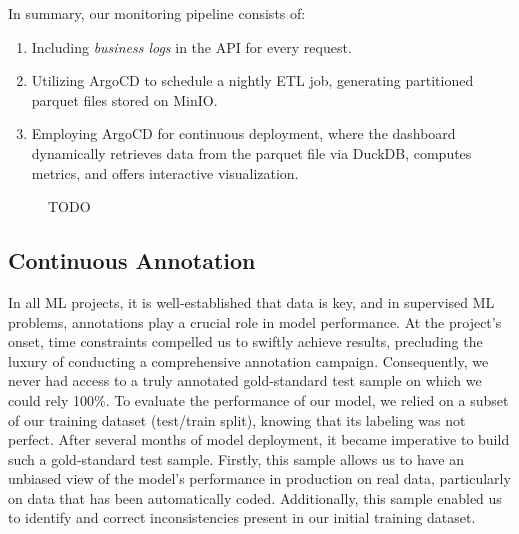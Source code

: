 In summary, our monitoring pipeline consists of:

\begin{enumerate}
    \item Including \textit{business logs} in the API for every request.
    \item Utilizing ArgoCD to schedule a nightly ETL job, generating partitioned parquet files stored on MinIO.
    \item Employing ArgoCD for continuous deployment, where the dashboard dynamically retrieves data from the parquet file via DuckDB, computes metrics, and offers interactive visualization.

\end{enumerate}

\begin{figure}[htbp]
    \centering
    \caption{TODO}
    \label{fig:monitoring-datalab}
\end{figure}


\subsection{Continuous Annotation}

In all ML projects, it is well-established that data is key, and in supervised ML problems, annotations play a crucial role in model performance. At the project's onset, time constraints compelled us to swiftly achieve results, precluding the luxury of conducting a comprehensive annotation campaign. Consequently, we never had access to a truly annotated gold-standard test sample on which we could rely 100\%. To evaluate the performance of our model, we relied on a subset of our training dataset (test/train split), knowing that its labeling was not perfect. After several months of model deployment, it became imperative to build such a gold-standard test sample. Firstly, this sample allows us to have an unbiased view of the model's performance in production on real data, particularly on data that has been automatically coded. Additionally, this sample enabled us to identify and correct inconsistencies present in our initial training dataset. 

